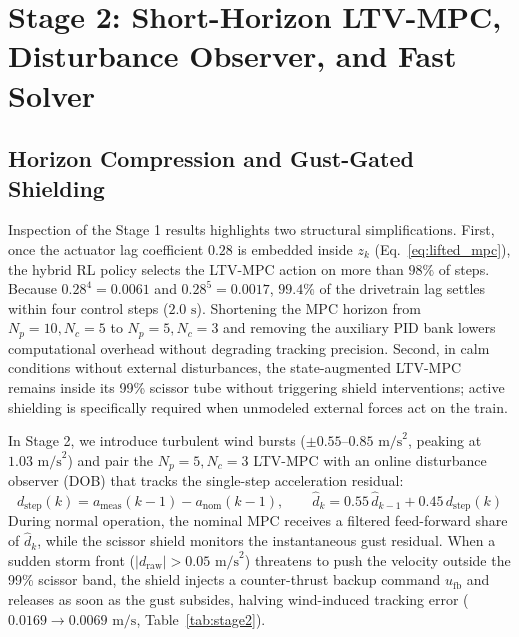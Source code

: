 \documentclass[10pt,a4paper]{article}
\begin{document}
\section{Stage 2: Short-Horizon LTV-MPC, Disturbance Observer, and Fast Solver}

\subsection{Horizon Compression and Gust-Gated Shielding}

Inspection of the Stage 1 results highlights two structural simplifications. First, once the actuator lag coefficient $0.28$ is embedded inside $z_k$ (Eq.~\ref{eq:lifted_mpc}), the hybrid RL policy selects the LTV-MPC action on more than $98\%$ of steps. Because $0.28^4 = 0.0061$ and $0.28^5 = 0.0017$, $99.4\%$ of the drivetrain lag settles within four control steps ($2.0\text{ s}$). Shortening the MPC horizon from $N_p = 10, N_c = 5$ to $N_p = 5, N_c = 3$ and removing the auxiliary PID bank lowers computational overhead without degrading tracking precision. Second, in calm conditions without external disturbances, the state-augmented LTV-MPC remains inside its 99\% scissor tube without triggering shield interventions; active shielding is specifically required when unmodeled external forces act on the train.

In Stage 2, we introduce turbulent wind bursts ($\pm 0.55\text{--}0.85\text{ m/s}^2$, peaking at $1.03\text{ m/s}^2$) and pair the $N_p = 5, N_c = 3$ LTV-MPC with an online disturbance observer (DOB) that tracks the single-step acceleration residual:
\begin{equation}
    d_{\text{step}}(k) = a_{\text{meas}}(k - 1) - a_{\text{nom}}(k - 1), \qquad \hat{d}_k = 0.55\,\hat{d}_{k-1} + 0.45\,d_{\text{step}}(k)
    \label{eq:dob}
\end{equation}
During normal operation, the nominal MPC receives a filtered feed-forward share of $\hat{d}_k$, while the scissor shield monitors the instantaneous gust residual. When a sudden storm front ($|d_{\text{raw}}| > 0.05\text{ m/s}^2$) threatens to push the velocity outside the 99\% scissor band, the shield injects a counter-thrust backup command $u_{\text{fb}}$ and releases as soon as the gust subsides, halving wind-induced tracking error ($0.0169 \to 0.0069\text{ m/s}$, Table~\ref{tab:stage2}).
\end{document}
